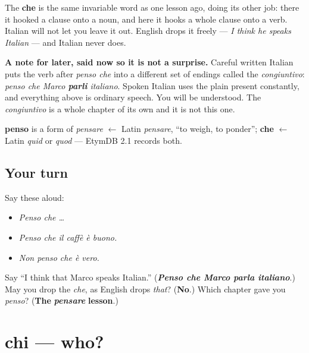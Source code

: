 The \textbf{che} is the same invariable word as one lesson ago, doing its other job: there it hooked a clause onto a noun, and here it hooks a whole clause onto a verb. Italian will not let you leave it out. English drops it freely — \emph{I think he speaks Italian} — and Italian never does.

\textbf{A note for later, said now so it is not a surprise.} Careful written Italian puts the verb after \emph{penso che} into a different set of endings called the \emph{congiuntivo}: \emph{penso che Marco \textbf{parli} italiano}. Spoken Italian uses the plain present constantly, and everything above is ordinary speech. You will be understood. The \emph{congiuntivo} is a whole chapter of its own and it is not this one.

\begin{cousinweb}
\textbf{penso} is a form of \emph{pensare} $\leftarrow$ Latin \emph{pensare}, \textquotedblleft{}to weigh, to ponder\textquotedblright{}; \textbf{che} $\leftarrow$ Latin \emph{quid} or \emph{quod} — EtymDB 2.1 records both.
\end{cousinweb}

\subsection*{Your turn}
Say these aloud:

\begin{itemize}
\raggedright
  \item \emph{Penso che …}
  \item \emph{Penso che il caffè è buono.}
  \item \emph{Non penso che è vero.}
\end{itemize}

\begin{tcolorbox}[breakable,colback=teal!4,colframe=teal!35!black,title={Before you move on}]
Say \textquotedblleft{}I think that Marco speaks Italian.\textquotedblright{} (\emph{\textbf{Penso che Marco parla italiano}}.) May you drop the \emph{che}, as English drops \emph{that}? (\textbf{No}.) Which chapter gave you \emph{penso}? (\textbf{The} \emph{\textbf{pensare}} \textbf{lesson}.)
\end{tcolorbox}
\section[chi]{chi — who?}

\label{lesson:IT-C31-chi}



